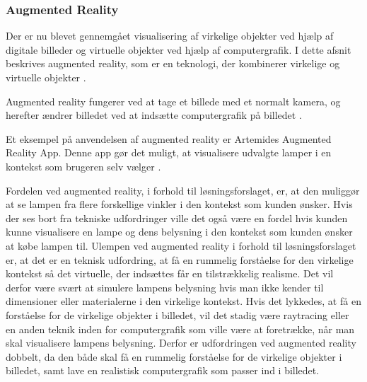 \subsubsection{Augmented Reality}
Der er nu blevet gennemgået visualisering af virkelige objekter ved hjælp af digitale billeder og virtuelle objekter ved hjælp af computergrafik. I dette afsnit beskrives augmented reality, som er en teknologi, der kombinerer virkelige og virtuelle objekter \cite{augmented_reality}.

Augmented reality fungerer ved at tage et billede med et normalt kamera, og herefter ændrer billedet ved at indsætte computergrafik på billedet \cite{augmented_reality}.

Et eksempel på anvendelsen af augmented reality er Artemides Augmented Reality App. Denne app gør det muligt, at visualisere udvalgte lamper i en kontekst som brugeren selv vælger \cite{artemides}. 

Fordelen ved augmented reality, i forhold til løsningsforslaget, er, at den muliggør at se lampen fra flere forskellige vinkler i den kontekst som kunden ønsker. Hvis der ses bort fra tekniske udfordringer ville det også være en fordel hvis kunden kunne visualisere en lampe og dens belysning i den kontekst som kunden ønsker at købe lampen til. \newline Ulempen ved augmented reality i forhold til løsningsforslaget er, at det er en teknisk udfordring, at få en rummelig forståelse for den virkelige kontekst så det virtuelle, der indsættes får en tilstrækkelig realisme. Det vil derfor være svært at simulere lampens belysning hvis man ikke kender til dimensioner eller materialerne i den virkelige kontekst. Hvis det lykkedes, at få en forståelse for de virkelige objekter i billedet, vil det stadig være raytracing eller en anden teknik inden for computergrafik som ville være at foretrække, når man skal visualisere lampens belysning. Derfor er udfordringen ved augmented reality dobbelt, da den både skal få en rummelig forståelse for de virkelige objekter i billedet, samt lave en realistisk computergrafik som passer ind i billedet.

